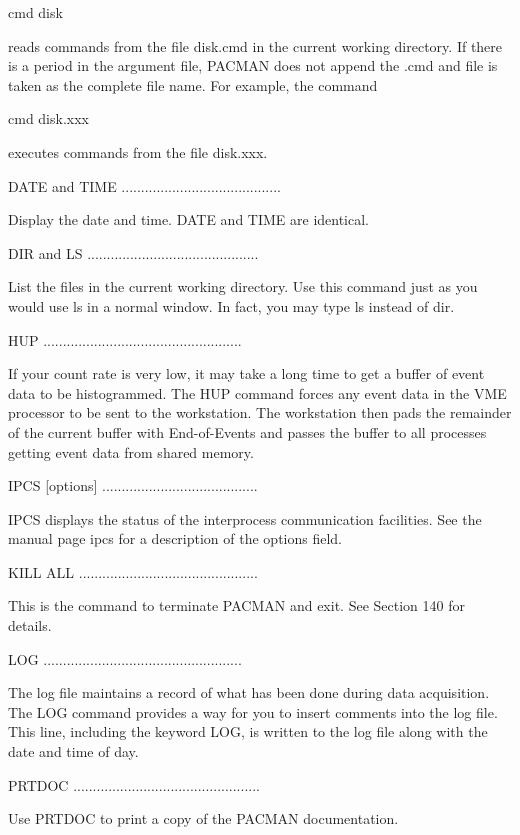         cmd disk
 
   reads commands from the file disk.cmd in the current working directory.  If
   there  is  a  period  in the argument file, PACMAN does not append the .cmd
   and file is taken as the complete file name.  For example, the command
 
        cmd  disk.xxx
 
   executes commands from the file disk.xxx.
 
   DATE and TIME .........................................
 
   Display the date and time.  DATE and TIME are identical.
 
   DIR and LS ............................................
 
   List the files in the current working directory.  Use this command  just as
   you  would  use ls in a normal window.  In fact, you may type ls instead of
   dir.
 
   HUP ...................................................
 
   If your count rate is very low, it may take a long time to get a buffer  of
   event  data  to  be histogrammed.  The HUP command forces any event data in
   the VME processor to be sent to  the  workstation.   The  workstation  then
   pads  the remainder of the current buffer with End-of-Events and passes the
   buffer to all processes getting event data from shared memory.
 
   IPCS [options] ........................................
 
   IPCS displays the status of the interprocess communication facilities.  See
   the manual page ipcs for a description of the options field.
 
   KILL ALL ..............................................
 
   This  is  the  command  to  terminate PACMAN and exit.  See Section 140 for
   details.
 
   LOG ...................................................
 
   The log file  maintains  a  record  of  what  has  been  done  during  data
   acquisition.   The  LOG  command  provides a way for you to insert comments
   into the log file.  This line, including the  keyword  LOG,  is  written to
   the log file along with the date and time of day.
 
   PRTDOC ................................................
 
   Use PRTDOC to print a copy of the PACMAN documentation.
 
